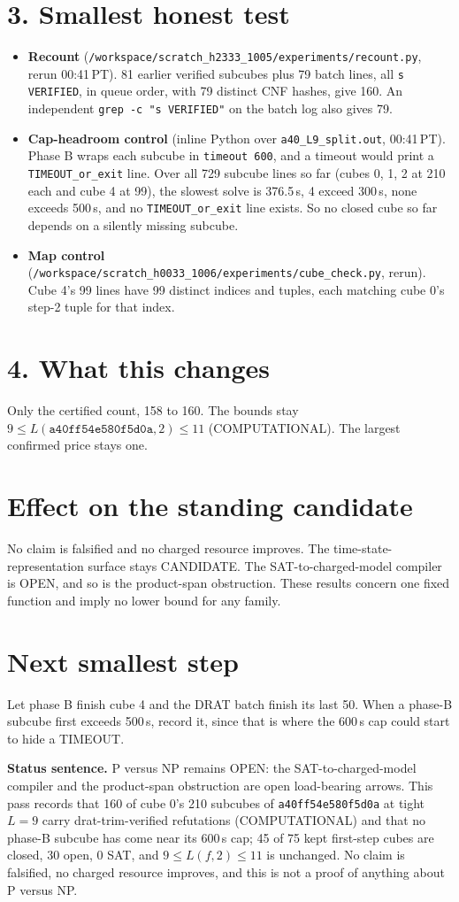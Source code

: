 \documentclass[11pt]{article}
\begin{document}
\section*{3. Smallest honest test}
\begin{itemize}
\item \textbf{Recount} (\texttt{/workspace/scratch\_h2333\_1005/experiments/recount.py}, rerun 00:41\,PT). 81 earlier verified subcubes plus 79 batch lines, all \texttt{s VERIFIED}, in queue order, with 79 distinct CNF hashes, give 160. An independent \texttt{grep -c "s VERIFIED"} on the batch log also gives 79.
\item \textbf{Cap-headroom control} (inline Python over \texttt{a40\_L9\_split.out}, 00:41\,PT). Phase B wraps each subcube in \texttt{timeout 600}, and a timeout would print a \texttt{TIMEOUT\_or\_exit} line. Over all 729 subcube lines so far (cubes 0, 1, 2 at 210 each and cube 4 at 99), the slowest solve is 376.5\,s, 4 exceed 300\,s, none exceeds 500\,s, and no \texttt{TIMEOUT\_or\_exit} line exists. So no closed cube so far depends on a silently missing subcube.
\item \textbf{Map control} (\texttt{/workspace/scratch\_h0033\_1006/experiments/cube\_check.py}, rerun). Cube 4's 99 lines have 99 distinct indices and tuples, each matching cube 0's step-2 tuple for that index.
\end{itemize}

\section*{4. What this changes}
Only the certified count, 158 to 160. The bounds stay $9\le L(\texttt{a40ff54e580f5d0a},2)\le 11$ (COMPUTATIONAL). The largest confirmed price stays one.

\section*{Effect on the standing candidate}
No claim is falsified and no charged resource improves. The time-state-representation surface stays CANDIDATE. The SAT-to-charged-model compiler is OPEN, and so is the product-span obstruction. These results concern one fixed function and imply no lower bound for any family.

\section*{Next smallest step}
Let phase B finish cube 4 and the DRAT batch finish its last 50. When a phase-B subcube first exceeds 500\,s, record it, since that is where the 600\,s cap could start to hide a TIMEOUT.

\bigskip
\noindent\textbf{Status sentence.} P versus NP remains OPEN: the SAT-to-charged-model compiler and the product-span obstruction are open load-bearing arrows. This pass records that 160 of cube 0's 210 subcubes of \texttt{a40ff54e580f5d0a} at tight $L=9$ carry drat-trim-verified refutations (COMPUTATIONAL) and that no phase-B subcube has come near its 600\,s cap; 45 of 75 kept first-step cubes are closed, 30 open, 0 SAT, and $9\le L(f,2)\le 11$ is unchanged. No claim is falsified, no charged resource improves, and this is not a proof of anything about P versus NP.
\end{document}
